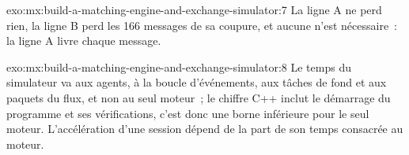 \begin{solution}{exo:mx:build-a-matching-engine-and-exchange-simulator:7}
La ligne A ne perd rien, la ligne B perd les 166 messages de sa coupure, et aucune  n'est nécessaire~: la ligne A livre chaque message.
\end{solution}

\begin{solution}{exo:mx:build-a-matching-engine-and-exchange-simulator:8}
Le temps du simulateur va aux agents, à la boucle d'événements, aux tâches de fond et aux paquets du flux, et non au seul moteur~; le chiffre C++ inclut le
démarrage du programme et ses vérifications, c'est donc une borne inférieure pour le seul moteur. L'accélération d'une session dépend de la part de son temps consacrée au moteur.
\end{solution}

